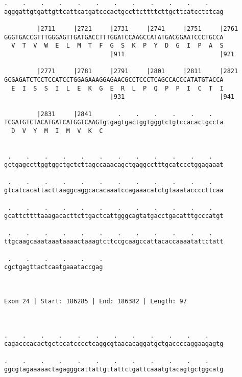 \documentclass{article}
\begin{document}
\begin{Verbatim}
.    .    .    .    .    .    .    .    .    .    .    .    
agggattgtgattgttcattcatgatcccactgccttcttttcttgcttcatcctctcag
                                                            
         |2711     |2721     |2731     |2741     |2751     |2761
GGGTGACCGTTTGGGAGTTGATGACCTTTGGATCCAAGCCATATGACGGAATCCCTGCCA
  V  T  V  W  E  L  M  T  F  G  S  K  P  Y  D  G  I  P  A  S
                             |911                          |921
  
         |2771     |2781     |2791     |2801     |2811     |2821
GCGAGATCTCCTCCATCCTGGAGAAAGGAGAACGCCTCCCTCAGCCACCCATATGTACCA
  E  I  S  S  I  L  E  K  G  E  R  L  P  Q  P  P  I  C  T  I
                             |931                          |941
  
         |2831     |2841       .    .    .    .    .    .   
TCGATGTCTACATGATCATGGTCAAGTgtgagtgactggtgggtctgtccacactgccta
  D  V  Y  M  I  M  V  K  C                                 
                                                            
  
 .    .    .    .    .    .    .    .    .    .    .    .   
gctgagccttggtggctgctcttagccaaacagctgaggcctttgcatccctggagaaat
                                                            
 .    .    .    .    .    .    .    .    .    .    .    .   
gtcatcacattacttaaggcaggcacacaaatccagaaacatctgtaaataccccttcaa
                                                            
 .    .    .    .    .    .    .    .    .    .    .    .   
gcattcttttaaagacacttcttgactcattgggcagtatgacctgacatttgcccatgt
                                                            
 .    .    .    .    .    .    .    .    .    .    .    .   
ttgcaagcaaataaataaaactaaagtcttccgcaagccattacaccaaaatattctatt
                                                            
 .    .    .    .    .    .
cgctgagttactcaatgaaataccgag
                           
                           
 
Exon 24 | Start: 186285 | End: 186382 | Length: 97



.    .    .    .    .    .    .    .    .    .    .    .    
cagacccacactgctccatcccctcaggcgtaacacaggatgctgaccccaggaagagtg
                                                            
.    .    .    .    .    .    .    .    .    .    .    .    
ggcgtagaaaaactagagggcattattgttattctgattcaaatgtacagtgctggcatg
                                                            

\end{Verbatim}
\end{document}
